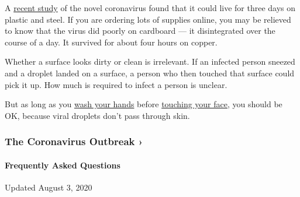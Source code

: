 A
\href{https://www.nytimes3xbfgragh.onion/2020/03/17/health/coronavirus-surfaces-aerosols.html}{recent
study} of the novel coronavirus found that it could live for three days
on plastic and steel. If you are ordering lots of supplies online, you
may be relieved to know that the virus did poorly on cardboard --- it
disintegrated over the course of a day. It survived for about four hours
on copper.

Whether a surface looks dirty or clean is irrelevant. If an infected
person sneezed and a droplet landed on a surface, a person who then
touched that surface could pick it up. How much is required to infect a
person is unclear.

But as long as you
\href{https://www.nytimes3xbfgragh.onion/2016/04/21/health/washing-hands.html}{wash
your hands} before
\href{https://www.nytimes3xbfgragh.onion/2020/03/02/well/live/coronavirus-spread-transmission-face-touching-hands.html}{touching
your face,} you should be OK, because viral droplets don't pass through
skin.

\href{https://www.nytimes3xbfgragh.onion/news-event/coronavirus?action=click\&pgtype=Article\&state=default\&region=MAIN_CONTENT_3\&context=storylines_faq}{}

\hypertarget{the-coronavirus-outbreak-}{%
\subsubsection{The Coronavirus Outbreak
›}\label{the-coronavirus-outbreak-}}

\hypertarget{frequently-asked-questions}{%
\paragraph{Frequently Asked
Questions}\label{frequently-asked-questions}}

Updated August 3, 2020

